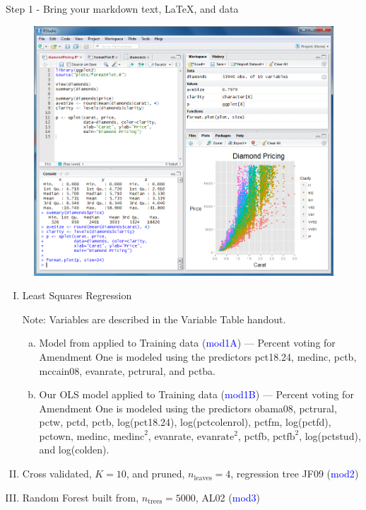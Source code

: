 \documentclass[final]{beamer}
\begin{document}
\begin{frame}[fragile]
\begin{columns}[t]
\begin{column}{0.31\linewidth}
\begin{minipage}[t][1.000\textheight]{\linewidth}
\vspace{0ex}
\begin{block}{Step 1 - Bring your markdown text, LaTeX, and data}
\vspace{0ex}
\begin{figure}
\includegraphics[width=\linewidth]{images/RStudio-Screenshot.png}
\end{figure}

\begin{enumerate}[I.]
\item Least Squares Regression
\vspace{0ex}

Note: Variables are described in the Variable Table handout.
\begin{enumerate}[a.]
\item Model from applied to Training data (\textcolor{blue}{mod1A}) --- Percent voting for Amendment One is modeled using the predictors pct18.24, medinc, pctb, mccain08, evanrate, pctrural, and pctba. 
\item Our OLS model applied to Training data (\textcolor{blue}{mod1B}) --- Percent voting for Amendment One is modeled using the predictors obama08, pctrural, pctw, pctd, pctb, log(pct18.24), log(pctcolenrol), pctfm, log(pctfd), pctown,  medinc, $\text{medinc}^2$, evanrate, $\text{evanrate}^2$, pctfb, $\text{pctfb}^2$, log(pctstud), and log(colden).
\end{enumerate}
\item Cross validated, $K = 10$, and pruned, $n_{\text{leaves}}=4$, regression tree {JF09} (\textcolor{blue}{mod2})
\item Random Forest built from, $n_{\text{trees}} = 5000 $, {AL02} (\textcolor{blue}{mod3})
\end{enumerate}
\vspace{0ex}


\end{block}
\end{minipage}
\end{column}
\end{columns}
\end{frame}
\end{document}
